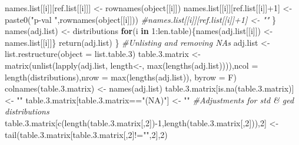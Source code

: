\documentclass[a4paper, twoside]{templates/ociamthesis}
\newenvironment{Shaded}{\begin{snugshade}}{\end{snugshade}}
\newcommand{\AttributeTok}[1]{\textcolor[rgb]{0.77,0.63,0.00}{#1}}
\newcommand{\CommentTok}[1]{\textcolor[rgb]{0.56,0.35,0.01}{\textit{#1}}}
\newcommand{\ControlFlowTok}[1]{\textcolor[rgb]{0.13,0.29,0.53}{\textbf{#1}}}
\newcommand{\DecValTok}[1]{\textcolor[rgb]{0.00,0.00,0.81}{#1}}
\newcommand{\FloatTok}[1]{\textcolor[rgb]{0.00,0.00,0.81}{#1}}
\newcommand{\FunctionTok}[1]{\textcolor[rgb]{0.00,0.00,0.00}{#1}}
\newcommand{\NormalTok}[1]{#1}
\newcommand{\OtherTok}[1]{\textcolor[rgb]{0.56,0.35,0.01}{#1}}
\newcommand{\SpecialCharTok}[1]{\textcolor[rgb]{0.00,0.00,0.00}{#1}}
\newcommand{\StringTok}[1]{\textcolor[rgb]{0.31,0.60,0.02}{#1}}
\renewenvironment{Shaded}
{
  \vspace{10pt}%
  \begin{snugshade}%
}{%
  \end{snugshade}%
  \vspace{8pt}%
}
\begin{document}
\begin{Shaded}
\begin{Highlighting}[]
\NormalTok{    names.list[[i]][ref.list[[i]]] }\OtherTok{\textless{}{-}} \FunctionTok{rownames}\NormalTok{(object[[i]])}
\NormalTok{    names.list[[i]][ref.list[[i]]}\SpecialCharTok{+}\DecValTok{1}\NormalTok{] }\OtherTok{\textless{}{-}} \FunctionTok{paste0}\NormalTok{(}\StringTok{"p{-}val "}\NormalTok{,}\FunctionTok{rownames}\NormalTok{(object[[i]]))}
    \CommentTok{\#names.list[[i]][ref.list[[i]]+1] \textless{}{-} ""}
\NormalTok{    \}}
  \FunctionTok{names}\NormalTok{(adj.list) }\OtherTok{\textless{}{-}}\NormalTok{ distributions}
  \ControlFlowTok{for}\NormalTok{(i }\ControlFlowTok{in} \DecValTok{1}\SpecialCharTok{:}\NormalTok{len.table)\{}\FunctionTok{names}\NormalTok{(adj.list[[i]]) }\OtherTok{\textless{}{-}}\NormalTok{ names.list[[i]]\}}
  \FunctionTok{return}\NormalTok{(adj.list)}
\NormalTok{\}}
\CommentTok{\#Unlisting and removing NAs}
\NormalTok{adj.list }\OtherTok{\textless{}{-}} \FunctionTok{list.restructure}\NormalTok{(}\AttributeTok{object =}\NormalTok{ list.table}\FloatTok{.3}\NormalTok{)}
\NormalTok{table.}\FloatTok{3.}\NormalTok{matrix }\OtherTok{\textless{}{-}} \FunctionTok{matrix}\NormalTok{(}\FunctionTok{unlist}\NormalTok{(}\FunctionTok{lapply}\NormalTok{(adj.list, }\StringTok{\textasciigrave{}}\AttributeTok{length\textless{}{-}}\StringTok{\textasciigrave{}}\NormalTok{, }\FunctionTok{max}\NormalTok{(}\FunctionTok{lengths}\NormalTok{(adj.list)))),}\AttributeTok{ncol =} \FunctionTok{length}\NormalTok{(distributions),}\AttributeTok{nrow =} \FunctionTok{max}\NormalTok{(}\FunctionTok{lengths}\NormalTok{(adj.list)), }\AttributeTok{byrow =}\NormalTok{ F)}
\FunctionTok{colnames}\NormalTok{(table.}\FloatTok{3.}\NormalTok{matrix) }\OtherTok{\textless{}{-}} \FunctionTok{names}\NormalTok{(adj.list)}
\NormalTok{table.}\FloatTok{3.}\NormalTok{matrix[}\FunctionTok{is.na}\NormalTok{(table.}\FloatTok{3.}\NormalTok{matrix)] }\OtherTok{\textless{}{-}} \StringTok{""}
\NormalTok{table.}\FloatTok{3.}\NormalTok{matrix[table.}\FloatTok{3.}\NormalTok{matrix}\SpecialCharTok{==}\StringTok{"(NA)"}\NormalTok{] }\OtherTok{\textless{}{-}} \StringTok{""}
\CommentTok{\#Adjustments for std \& ged distributions}
\NormalTok{table.}\FloatTok{3.}\NormalTok{matrix[}\FunctionTok{c}\NormalTok{(}\FunctionTok{length}\NormalTok{(table.}\FloatTok{3.}\NormalTok{matrix[,}\DecValTok{2}\NormalTok{])}\SpecialCharTok{{-}}\DecValTok{1}\NormalTok{,}\FunctionTok{length}\NormalTok{(table.}\FloatTok{3.}\NormalTok{matrix[,}\DecValTok{2}\NormalTok{])),}\DecValTok{2}\NormalTok{] }\OtherTok{\textless{}{-}} \FunctionTok{tail}\NormalTok{(table.}\FloatTok{3.}\NormalTok{matrix[table.}\FloatTok{3.}\NormalTok{matrix[,}\DecValTok{2}\NormalTok{]}\SpecialCharTok{!=}\StringTok{""}\NormalTok{,}\DecValTok{2}\NormalTok{],}\DecValTok{2}\NormalTok{)}

\end{Highlighting}
\end{Shaded}
\end{document}
